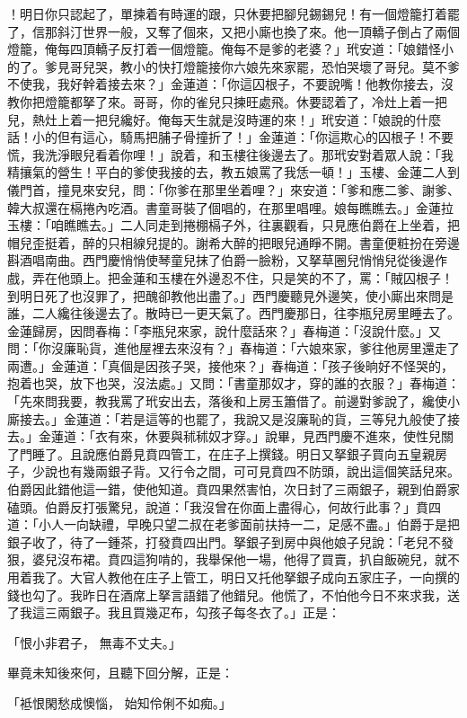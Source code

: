 ！明日你只認起了，單揀着有時運的跟，只休要把腳兒錫錫兒！有一個燈籠打着罷了，信那斜汀世界一般，又奪了個來，又把小廝也換了來。他一頂轎子倒占了兩個燈籠，俺每四頂轎子反打着一個燈籠。俺每不是爹的老婆？」玳安道：「娘錯怪小的了。爹見哥兒哭，教小的快打燈籠接你六娘先來家罷，恐怕哭壞了哥兒。莫不爹不使我，我好幹着接去來？」金蓮道：「你這囚根子，不要說嘴！他教你接去，沒教你把燈籠都拏了來。哥哥，你的雀兒只揀旺處飛。休要認着了，冷灶上着一把兒，熱灶上着一把兒纔好。俺每天生就是沒時運的來！」玳安道：「娘說的什麼話！小的但有這心，騎馬把脯子骨撞折了！」金蓮道：「你這欺心的囚根子！不要慌，我洗淨眼兒看着你哩！」說着，和玉樓往後邊去了。那玳安對着眾人說：「我精攘氣的營生！平白的爹使我接的去，教五娘罵了我恁一頓！」玉樓、金蓮二人到儀門首，撞見來安兒，問：「你爹在那里坐着哩？」來安道：「爹和應二爹、謝爹、韓大叔還在槅捲內吃酒。書童哥裝了個唱的，在那里唱哩。娘每瞧瞧去。」金蓮拉玉樓：「咱瞧瞧去。」二人同走到捲棚槅子外，往裏觀看，只見應伯爵在上坐着，把帽兒歪挺着，醉的只相線兒提的。謝希大醉的把眼兒通睜不開。書童便粧扮在旁邊斟酒唱南曲。西門慶悄悄使琴童兒抹了伯爵一臉粉，又拏草圈兒悄悄兒從後邊作戲，弄在他頭上。把金蓮和玉樓在外邊忍不住，只是笑的不了，罵：「賊囚根子！到明日死了也沒罪了，把醜卻教他出盡了。」西門慶聽見外邊笑，使小廝出來問是誰，二人纔往後邊去了。散時已一更天氣了。西門慶那日，往李瓶兒房里睡去了。金蓮歸房，因問春梅：「李瓶兒來家，說什麼話來？」春梅道：「沒說什麼。」又問：「你沒廉恥貨，進他屋裡去來沒有？」春梅道：「六娘來家，爹往他房里還走了兩遭。」金蓮道：「真個是因孩子哭，接他來？」春梅道：「孩子後晌好不怪哭的，抱着也哭，放下也哭，沒法處。」又問：「書童那奴才，穿的誰的衣服？」春梅道：「先來問我要，教我罵了玳安出去，落後和上房玉簫借了。前邊對爹說了，纔使小廝接去。」金蓮道：「若是這等的也罷了，我說又是沒廉恥的貨，三等兒九般使了接去。」金蓮道：「衣有來，休要與秫秫奴才穿。」說畢，見西門慶不進來，使性兒關了門睡了。且說應伯爵見賁四管工，在庄子上撰錢。明日又拏銀子買向五皇親房子，少說也有幾兩銀子背。又行令之間，可可見賁四不防頭，說出這個笑話兒來。伯爵因此錯他這一錯，使他知道。賁四果然害怕，次日封了三兩銀子，親到伯爵家磕頭。伯爵反打張驚兒，說道：「我沒曾在你面上盡得心，何故行此事？」賁四道：「小人一向缺禮，早晚只望二叔在老爹面前扶持一二，足感不盡。」伯爵于是把銀子收了，待了一鍾茶，打發賁四出門。拏銀子到房中與他娘子兒說：「老兒不發狠，婆兒沒布裙。賁四這狗啃的，我舉保他一場，他得了買賣，扒自飯碗兒，就不用着我了。大官人教他在庄子上管工，明日又托他拏銀子成向五家庄子，一向撰的錢也勾了。我昨日在酒席上拏言語錯了他錯兒。他慌了，不怕他今日不來求我，送了我這三兩銀子。我且買幾疋布，勾孩子每冬衣了。」正是：

「恨小非君子，  無毒不丈夫。」

畢竟未知後來何，且聽下回分解，正是：

「袛恨閑愁成懊惱，  始知伶俐不如痴。」

